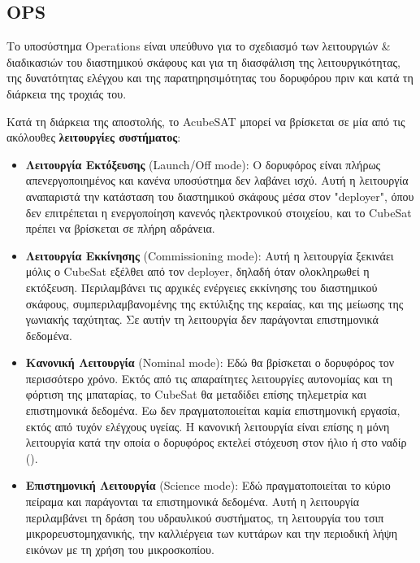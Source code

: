 \documentclass[a4paper,nobib]{tufte-book}
\begin{document}
\subsection{\acf{OPS}}

Το υποσύστημα Operations είναι υπεύθυνο για το σχεδιασμό των λειτουργιών \& διαδικασιών του διαστημικού σκάφους και για τη διασφάλιση της λειτουργικότητας, της δυνατότητας ελέγχου και της παρατηρησιμότητας του δορυφόρου πριν και κατά τη διάρκεια της τροχιάς του.

Κατά τη διάρκεια της αποστολής, το AcubeSAT μπορεί να βρίσκεται σε μία από τις ακόλουθες \textbf{λειτουργίες συστήματος}:\autocite{MDO}
\begin{itemize}
	\item \textbf{Λειτουργία Εκτόξευσης} (Launch/Off mode): Ο δορυφόρος είναι πλήρως απενεργοποιημένος και κανένα υποσύστημα δεν λαβάνει ισχύ. Αυτή η λειτουργία αναπαριστά την κατάσταση του διαστημικού σκάφους μέσα στον "deployer", όπου δεν επιτρέπεται η ενεργοποίηση κανενός ηλεκτρονικού στοιχείου,\autocite[req. 3.3.3]{CDS13} και το CubeSat πρέπει να βρίσκεται σε πλήρη αδράνεια.
	
	\item \textbf{Λειτουργία Εκκίνησης} (Commissioning mode): Αυτή η λειτουργία ξεκινάει μόλις ο CubeSat εξέλθει από τον deployer, δηλαδή όταν ολοκληρωθεί η εκτόξευση. Περιλαμβάνει τις αρχικές ενέργειες εκκίνησης του διαστημικού σκάφους, συμπεριλαμβανομένης της εκτύλιξης της κεραίας, και της μείωσης της γωνιακής ταχύτητας. Σε αυτήν τη λειτουργία δεν παράγονται επιστημονικά δεδομένα.
	
	\item \textbf{Κανονική Λειτουργία} (Nominal mode): Εδώ θα βρίσκεται ο δορυφόρος τον περισσότερο χρόνο. Εκτός από τις απαραίτητες λειτουργίες αυτονομίας και τη φόρτιση της μπαταρίας, το CubeSat θα μεταδίδει επίσης τηλεμετρία και επιστημονικά δεδομένα. Εω δεν πραγματοποιείται καμία επιστημονική εργασία, εκτός από τυχόν ελέγχους υγείας. Η κανονική λειτουργία είναι επίσης η μόνη λειτουργία κατά την οποία ο δορυφόρος εκτελεί στόχευση στον ήλιο ή στο ναδίρ ().
	
	\item \textbf{Επιστημονική Λειτουργία} (Science mode): Εδώ πραγματοποιείται το κύριο πείραμα και παράγονται τα επιστημονικά δεδομένα. Αυτή η λειτουργία περιλαμβάνει τη δράση του υδραυλικού συστήματος, τη λειτουργία του τσιπ μικρορευστομηχανικής, την καλλιέργεια των κυττάρων και την περιοδική λήψη εικόνων με τη χρήση του μικροσκοπίου.
	

\end{itemize}
\end{document}
